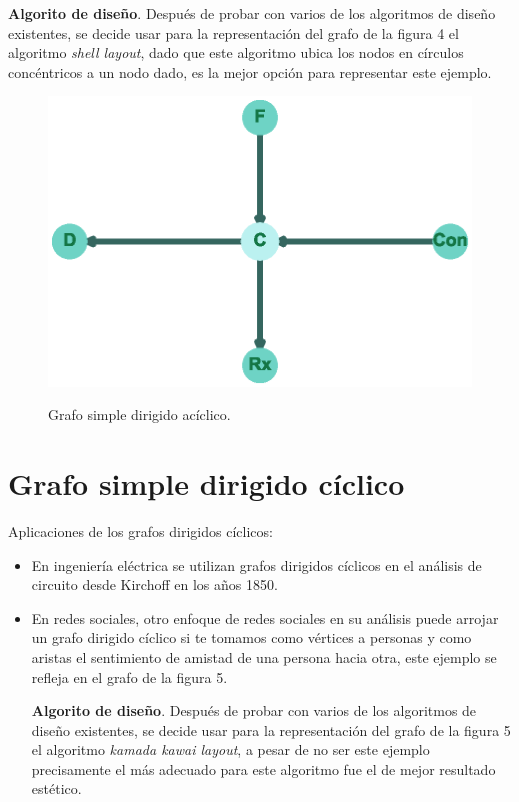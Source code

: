 \documentclass{article}
\begin{document}
\textbf{Algorito de diseño}.
Después de probar con varios de los algoritmos de diseño existentes, se decide usar para la representación del grafo de la figura 4 el algoritmo \textit{shell layout}, dado que este algoritmo ubica los nodos en círculos concéntricos a un nodo dado, es la mejor opción para representar este ejemplo.



\begin{center}

\end{center}

\begin{figure}[h]
\begin{center}
\includegraphics[scale=0.7]{Graf4_shell_layout.eps}\\
\caption{Grafo simple dirigido acíclico.}
\end{center}
\end{figure}
\newpage

\section{Grafo simple dirigido cíclico}
Aplicaciones de los grafos dirigidos cíclicos:
\begin{itemize}
\item En ingeniería eléctrica se utilizan grafos dirigidos cíclicos en el análisis de circuito desde Kirchoff en los años 1850.
\item En redes sociales, otro enfoque de redes sociales en su análisis puede arrojar un grafo dirigido cíclico si te tomamos como vértices a personas y como aristas el sentimiento de amistad de una persona hacia otra, este ejemplo se refleja en el grafo de la figura 5.

\textbf{Algorito de diseño}.
Después de probar con varios de los algoritmos de diseño existentes, se decide usar para la representación del grafo de la figura 5 el algoritmo \textit{kamada kawai layout}, a pesar de no ser este ejemplo precisamente el más adecuado para este algoritmo fue el de mejor resultado estético.


\end{itemize}
\begin{center}

\end{center}
\end{document}
